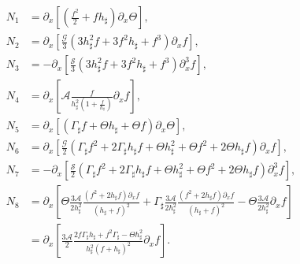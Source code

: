 \documentclass[reqno,11pt]{amsart}
\newcommand{\pax}{\partial_x}
\newcommand{\bh}{h_\sharp}
\newcommand{\bG}{\Gamma_\sharp}
\begin{document}
\begin{align*}
N_1&=\pax\left[\left(\frac{f^2}{2}+f\bh\right)\partial_x \Theta\right],\\
N_2&=\partial_x \left[\frac{\mathcal{G}}{3}\left(3\bh^2 f+3f^2\bh+f^3\right)\partial_x f\right],\\
N_3&=-\partial_x \left[\frac{\mathcal{S}}{3}\left(3\bh^2 f+3f^2\bh+f^3\right)\partial_x^3 f\right],\\
N_4&=\partial_x \left[\mathcal{A}\frac{f}{\bh^2(1+\frac{f}{\bh})}\partial_x f \right],\\
N_5&=\pax\left[\left(\bG f+\Theta\bh+\Theta f\right)\partial_x \Theta\right],\\
N_6&=\pax\left[\frac{\mathcal{G}}{2}\left(\bG f^2+2\bG\bh f+\Theta\bh^2+\Theta f^2+2\Theta\bh f\right)\partial_x f\right],\\
N_7&=-\pax\left[\frac{\mathcal{S}}{2}\left(\bG f^2+2\bG\bh f+\Theta\bh^2+\Theta f^2+2\Theta\bh f\right)\partial_x^3 f\right],\\
N_8&=\partial_x \left[\Theta \frac{3\mathcal{A}}{2\bh^2} \frac{(f^2+2\bh f)\partial_x f }{(\bh+f)^{2}}+\bG\frac{3\mathcal{A}}{2\bh^2} \frac{(f^2+2\bh f)\partial_x f }{(\bh+f)^{2}}-\Theta \frac{3\mathcal{A}}{2\bh^2} \partial_x f \right]\\
&= \partial_x \left[ \frac{3\mathcal{A}}{2}\frac{2f\bG\bh+f^2\bG-\Theta \bh^2}{\bh^2(f+\bh)^2}\partial_x f\right].
\end{align*}
\end{document}
